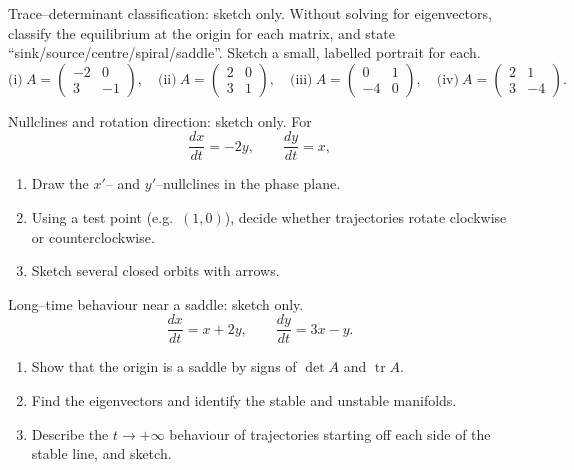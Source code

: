 \documentclass[11pt]{article}
\def\textbf#1{#1}%
\newcounter{question}
\begin{document}
\begin{question}
\textbf{Trace–determinant classification: sketch only.}
Without solving for eigenvectors, classify the equilibrium at the origin for each matrix,
and state “sink/source/centre/spiral/saddle”. Sketch a small, labelled portrait for each.
\[
\text{(i)}\ A=\begin{pmatrix}-2&0\\ 3&-1\end{pmatrix},\quad
\text{(ii)}\ A=\begin{pmatrix}2&0\\ 3&1\end{pmatrix},\quad
\text{(iii)}\ A=\begin{pmatrix}0&1\\ -4&0\end{pmatrix},\quad
\text{(iv)}\ A=\begin{pmatrix}2&1\\ 3&-4\end{pmatrix}.
\]
\end{question}

\begin{question}
\textbf{Nullclines and rotation direction: sketch only.}
For
\[
\frac{dx}{dt}=-2y,\qquad \frac{dy}{dt}=x,
\]
\begin{enumerate}
  \item Draw the $x'$– and $y'$–nullclines in the phase plane.
  \item Using a test point (e.g.\ $(1,0)$), decide whether trajectories rotate clockwise or counterclockwise.
  \item Sketch several closed orbits with arrows.
\end{enumerate}
\end{question}

\begin{question}
\textbf{Long–time behaviour near a saddle: sketch only.}
\[
\frac{dx}{dt}=x+2y,\qquad \frac{dy}{dt}=3x-y.
\]
\begin{enumerate}
  \item Show that the origin is a saddle by signs of $\det A$ and $\operatorname{tr}A$.
  \item Find the eigenvectors and identify the stable and unstable manifolds.
  \item Describe the $t\to+\infty$ behaviour of trajectories starting off each side of the stable line, and sketch.
\end{enumerate}
\end{question}
\end{document}
